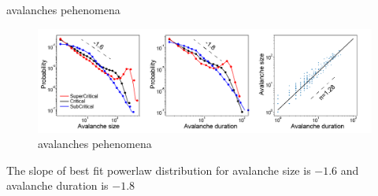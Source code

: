 \documentclass{beamer}
\begin{document}
\begin{frame}{avalanches pehenomena}
	\begin{figure}[htbp]
		\centering
		\includegraphics[width=0.9\linewidth]{fig/avalanches_distribution}
		\caption{avalanches pehenomena}
	\end{figure}
	The slope of best fit powerlaw distribution for avalanche size is $ -1.6 $ and avalanche duration is $ -1.8 $
\end{frame}
\end{document}
